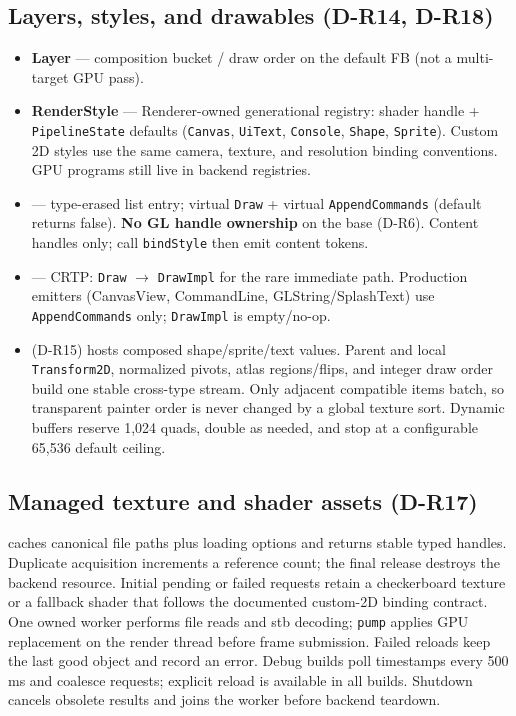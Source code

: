 \subsection{Layers, styles, and drawables (D-R14, D-R18)}
\begin{itemize}
  \item \textbf{Layer} --- composition bucket / draw order on the default FB
        (not a multi-target GPU pass).
  \item \textbf{RenderStyle} --- Renderer-owned generational registry: shader handle +
        \texttt{PipelineState} defaults (\texttt{Canvas}, \texttt{UiText},
        \texttt{Console}, \texttt{Shape}, \texttt{Sprite}). Custom 2D styles
        use the same camera, texture, and resolution binding conventions. GPU
        programs still live in backend registries.
  \item {} --- type-erased list entry; virtual
        \texttt{Draw} + virtual \texttt{AppendCommands} (default returns false).
        \textbf{No GL handle ownership} on the base (D-R6). Content handles
        only; call \texttt{bindStyle} then emit content tokens.
  \item {} --- CRTP: \texttt{Draw} $\rightarrow$
        \texttt{DrawImpl} for the rare immediate path. Production emitters
        (CanvasView, CommandLine, GLString/SplashText) use
        \texttt{AppendCommands} only; \texttt{DrawImpl} is empty/no-op.
  \item {} (D-R15) hosts composed
        shape/sprite/text values. Parent and local \texttt{Transform2D},
        normalized pivots, atlas regions/flips, and integer draw order build one
        stable cross-type stream. Only adjacent compatible items batch, so
        transparent painter order is never changed by a global texture sort.
        Dynamic buffers reserve 1,024 quads, double as needed, and stop at a
        configurable 65,536 default ceiling.
\end{itemize}

\subsection{Managed texture and shader assets (D-R17)}
 caches canonical file paths plus loading options and
returns stable typed handles. Duplicate acquisition increments a reference
count; the final release destroys the backend resource. Initial pending or
failed requests retain a checkerboard texture or a fallback shader that follows
the documented custom-2D binding contract. One owned worker performs file reads
and stb decoding; \texttt{pump} applies GPU
replacement on the render thread before frame submission. Failed reloads keep
the last good object and record an error. Debug builds poll timestamps every
500\,ms and coalesce requests; explicit reload is available in all builds.
Shutdown cancels obsolete results and joins the worker before backend teardown.

